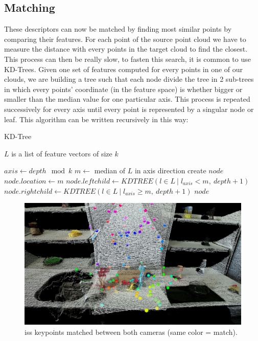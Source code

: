 \subsection{Matching}

    These descriptors can now be matched by finding most similar points by comparing their features. For each point of the source point cloud we have to measure the distance with every points in the target cloud to find the closest. \\
    This process can then be really slow, to fasten this search, it is common to use KD-Trees. Given one set of features computed for every points in one of our clouds, we are building a tree such that each node divide the tree in 2 sub-trees in which every points' coordinate (in the feature space) is whether bigger or smaller than the median value for one particular axis. This process is repeated successively for every axis until every point is represented by a singular node or leaf. This algorithm can be written recursively in this way:
    
    \begin{algorithm}
        \caption{KD-Tree}\label{alg:kdtree}
        \REQUIRE $L$ is a list of feature vectors of size $k$
        \begin{algorithmic}[1]
                \State $axis \longleftarrow depth \mod{k}$
                \State $m \longleftarrow $ median of $L$ in axis direction
                \State create $node$
                \State $node.location \longleftarrow m$
                \State $node.leftchild \longleftarrow KDTREE({l \in L \:\vert\; l_{axis} < m}, \:depth + 1)$
                \State $node.rightchild \longleftarrow KDTREE({l \in L \:\vert\; l_{axis} \geq m}, \:depth + 1)$
                \State \Return $node$
            \EndFunction
        \end{algorithmic}
    \end{algorithm}
    
    \begin{figure}[h!]
        \centering
        \includegraphics[width=\textwidth]{images/kp_matches.png}
        \caption{\acrshort{iss} keypoints matched between both cameras (same color = match).}
        \label{fig:iss_match}
    \end{figure}
    
